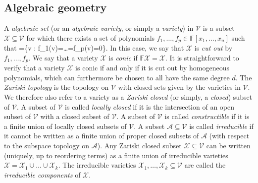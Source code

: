 \documentclass[11pt]{article}
\theoremstyle{definition}
\newcommand{\field}{\mathbb{F}}
\newcommand\X{\mathcal{X}}
\newcommand\A{\mathcal{A}}
\newcommand\V{\mathcal{V}}
\newcommand{\hook}{\mathbin{\lrcorner}}
\def\ba#1\ea{\begin{align}#1\end{align}}
\begin{document}


\subsection{Algebraic geometry}\label{sec:MP:AG}

A \textit{algebraic set} (or an \textit{algebraic variety}, or simply a \textit{variety}) in $\V$ is a subset $\X \subseteq \V$ for which there exists a set of polynomials $f_1,\dots, f_p \in \field[x_1,\dots, x_n]$ such that
\ba
\X=\{v \in \V : f_1(v)=\dots=f_p(v)=0\}.
\ea
In this case, we say that $\X$ is \textit{cut out} by $f_1,\dots, f_p$. We say that a variety $\X$ is \textit{conic} if $\field \X=\X$. It is straightforward to verify that a variety $\X$ is conic if and only if it is cut out by homogeneous polynomials, which can furthermore be chosen to all have the same degree $d$. The \textit{Zariski topology} is the topology on $\V$ with closed sets given by the varieties in $\V$. We therefore also refer to a variety as a \textit{Zariski closed} (or simply, a \textit{closed}) subset of $\V$. A subset of $\V$ is called \textit{locally closed} if it is the intersection of an open subset of $\V$ with a closed subset of $\V$. A subset of $\V$ is called \textit{constructible} if it is a finite union of locally closed subsets of $\V$.
A subset $\A \subseteq \V$ is called \textit{irreducible} if it cannot be written as a finite union of proper closed subsets of $\A$ (with respect to the subspace topology on $\A$). Any Zariski closed subset $\X \subseteq \V$ can be written (uniquely, up to reordering terms) as a finite union of irreducible varieties $\X=\X_1 \cup \dots \cup \X_k$. The irreducible varieties $\X_1,\dots, \X_k \subseteq \V$ are called the \textit{irreducible components} of $\X$.
\end{document}
